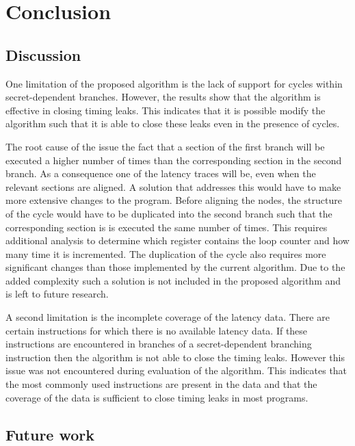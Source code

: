 
\chapter{Conclusion}

\section{Discussion}
One limitation of the proposed algorithm is the lack of support for cycles within secret-dependent branches.
However, the results show that the algorithm is effective in closing timing leaks. 
This indicates that it is possible modify the algorithm such that it is able to close these leaks even in the presence of cycles. 

The root cause of the issue the fact that a section of the first branch will be executed a higher number of times than the corresponding section in the second branch. 
As a consequence one of the latency traces will be, even when the relevant sections are aligned.
A solution that addresses this would have to make more extensive changes to the program. 
Before aligning the nodes, the structure of the cycle would have to be duplicated into the second branch such that the corresponding section is is executed the same number of times. 
This requires additional analysis to determine which register contains the loop counter and how many time it is incremented. 
The duplication of the cycle also requires more significant changes than those implemented by the current algorithm. %
Due to the added complexity such a solution is not included in the proposed algorithm and is left to future research. 

A second limitation is the incomplete coverage of the latency data. There are certain instructions for which there is no available latency data. 
If these instructions are encountered in branches of  a secret-dependent branching instruction then the algorithm is not able to close the timing leaks. 
However this issue was not encountered during evaluation of the algorithm. 
This indicates that the most commonly used instructions are present in the data and that the coverage of the data is sufficient to close timing leaks in most programs. 

\section{Future work}